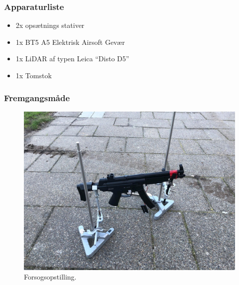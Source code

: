 \subsubsection{Apparaturliste}
\begin{itemize}
\item 2x opsætnings stativer
\item 1x BT5 A5 Elektrisk Airsoft Gevær
\item 1x LiDAR af typen Leica “Disto D5”
\item 1x Tomstok
\end{itemize}

\subsubsection{Fremgangsmåde}

\begin{figure}[H]
\centering
\includegraphics[scale=0.4]{Billeder/Opstilling.png}
\caption{Forsogsopstilling.}
\label{fig:Opstilling}
\end{figure}


